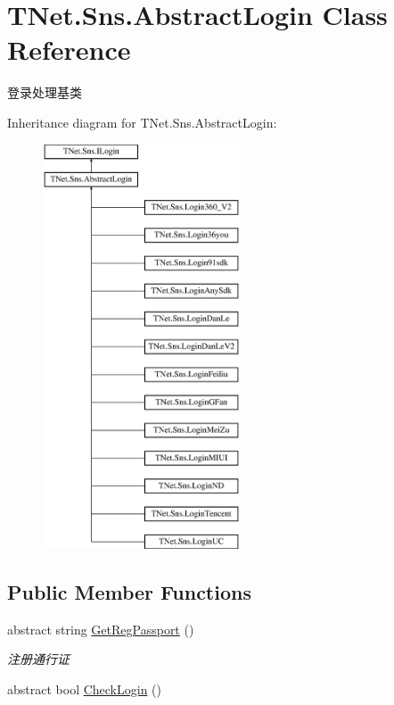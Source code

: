 \hypertarget{class_t_net_1_1_sns_1_1_abstract_login}{}\section{T\+Net.\+Sns.\+Abstract\+Login Class Reference}
\label{class_t_net_1_1_sns_1_1_abstract_login}


登录处理基类  


Inheritance diagram for T\+Net.\+Sns.\+Abstract\+Login\+:\begin{figure}[H]
\begin{center}
\leavevmode
\includegraphics[height=12.000000cm]{class_t_net_1_1_sns_1_1_abstract_login}
\end{center}
\end{figure}
\subsection*{Public Member Functions}
\begin{DoxyCompactItemize}
\item 
abstract string \mbox{\hyperlink{class_t_net_1_1_sns_1_1_abstract_login_a3930eb564bb4804e1b646d749f20907a}{Get\+Reg\+Passport}} ()
\begin{DoxyCompactList}\small\item\em 注册通行证 \end{DoxyCompactList}\item 
abstract bool \mbox{\hyperlink{class_t_net_1_1_sns_1_1_abstract_login_a6b5dac3d6d46efb7b1e4049e674105e5}{Check\+Login}} ()
\end{DoxyCompactItemize}
